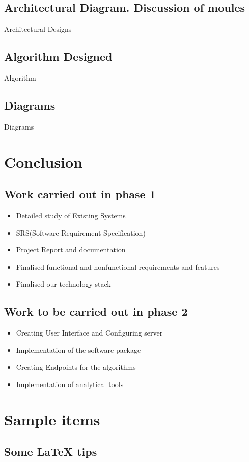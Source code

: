 \documentclass[a4paper]{report}
\begin{document}
    \section{Architectural Diagram. Discussion of moules}
    Architectural Designs
    \section{Algorithm Designed}
    Algorithm 
    \section{Diagrams}
    Diagrams

    \chapter {Conclusion}
    \section{Work carried out in phase 1}
    \begin{itemize}
      \item  Detailed study of Existing Systems
      \item  SRS(Software Requirement Specification)
      \item  Project Report and documentation
      \item  Finalised functional and nonfunctional requirements and features
      \item  Finalised our technology stack
    \end{itemize}
    \section{Work to be carried out in phase 2}
    \begin{itemize}
      \item  Creating User Interface and Configuring server
      \item  Implementation of the software package
      \item  Creating Endpoints for the algorithms
      \item  Implementation of analytical tools 
    \end{itemize}    


    \chapter{Sample items}
    \section{Some LaTeX tips}
    \label{sec:latex}
\end{document}
